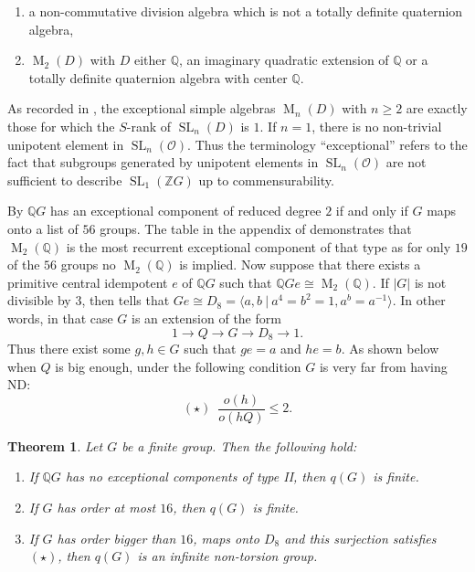 \documentclass[a4paper,10pt]{amsart}
\newtheorem{theorem}[lemma]{Theorem}
\theoremstyle{definition}
\theoremstyle{remark}
\newcommand{\SL}{\operatorname{SL}}
\newcommand{\Ma}{\operatorname{M}}
\renewcommand{\O}{\mathcal{O}}
\newcommand{\Z}{{\mathbb Z}}
\newcommand{\Q}{{\mathbb Q}}
\begin{document}
\begin{enumerate}
\item[I:] a non-commutative division algebra which is not a totally definite quaternion algebra,

\item[II:] $\Ma_2(D)$ with $D$ either $\Q$, an imaginary quadratic extension of $\Q$ or a totally definite quaternion algebra with center $\Q$. 
\end{enumerate}

As recorded in \cite[Lemma 6.9]{BJJKT}, the exceptional simple algebras $\Ma_n(D)$ with $n \geq 2$ are exactly those for which the $S$-rank of $\SL_n(D)$ is $1$. If $n = 1$, there is no non-trivial unipotent element in $\SL_n(\O)$. Thus the terminology ``exceptional'' refers to the fact that subgroups generated by unipotent elements in $\SL_n(\O)$ are not sufficient to describe $\SL_1(\Z G)$ up to commensurability. 

By \cite{EKVG} $\Q G$ has an exceptional component of reduced degree $2$ if and only if $G$ maps onto a list of $56$ groups. The table in the appendix of \cite{BJJKT} demonstrates that $\Ma_2(\Q)$ is the most recurrent exceptional component of that type as for only $19$ of the $56$ groups no $\Ma_2(\Q)$ is implied. Now suppose that there exists a primitive central idempotent $e$ of $\Q G$ such that $\Q Ge \cong \Ma_2(\Q)$. If $|G|$ is not divisible by $3$, then \cite[Remark 6.17]{BJJKT2} tells that $Ge \cong D_8 = \langle a,b \ | \ a^4=b^2=1, a^b = a^{-1} \rangle$. In other words, in that case $G$ is an extension of the form 
$$1 \rightarrow Q \rightarrow G \rightarrow D_8 \rightarrow 1.$$
Thus there exist some $g,h\in G$ such that $ge = a$ and $he = b$. As shown below when $Q$ is big enough, under the following condition $G$ is very far from having ND:
$$
(\star) \, \, \, \frac{o(h)}{o(hQ)} \leq 2. 
$$ 

\begin{theorem}\label{when q(G) finite for grp rings}
Let $G$ be a finite group. Then the following hold:
\begin{enumerate}
\item[(i)]  If $\Q G$ has no exceptional components of type II, then $q(G)$ is finite.
\item[(ii)] If $G$ has order at most $16$, then $q(G)$ is finite.
\item[(iii)] If $G$ has order bigger than $16$, maps onto $D_8$ and this surjection satisfies $(\star)$, then $q(G)$ is an infinite non-torsion group.
\end{enumerate}
\end{theorem}
\end{document}
